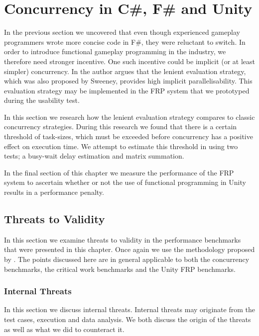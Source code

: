 \chapter{Concurrency in C\#, F\# and Unity}
In the previous section we uncovered that even though experienced gameplay programmers wrote more concise code in F\#, they were reluctant to switch. In order to introduce functional gameplay programming in the industry, we therefore need stronger incentive. One such incentive could be implicit (or at least simpler) concurrency. In \cite{DBLP:journals/cl/Tremblay-parallel} the author argues that the lenient evaluation strategy, which was also proposed by Sweeney, provides high implicit parallelisability. This evaluation strategy may be implemented in the \gls{FRP} system that we prototyped during the usability test.

In this section we research how the lenient evaluation strategy compares to classic concurrency strategies. During this research we found that there is a certain threshold of task-sizes, which must be exceeded before concurrency has a positive effect on execution time. We attempt to estimate this threshold in  using two tests; a busy-wait delay estimation and matrix summation.

In the final section of this chapter we measure the performance of the \gls{FRP} system to ascertain whether or not the use of functional programming in Unity results in a performance penalty. 





\section{Threats to Validity}
In this section we examine threats to validity in the performance benchmarks that were presented in this chapter. Once again we use the methodology proposed by \cite{mcleod:validity}. The points discussed here are in general applicable to both the concurrency benchmarks, the critical work benchmarks and the Unity \gls{FRP} benchmarks.

\subsection{Internal Threats}
In this section we discuss internal threats. Internal threats may originate from the test cases, execution and data analysis. We both discuss the origin of the threats as well as what we did to counteract it.

